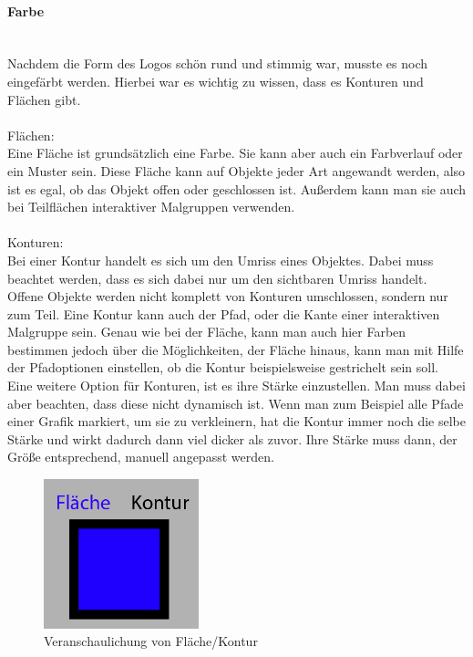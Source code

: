 \paragraph{Farbe}
\leavevmode \\
Nachdem die Form des Logos schön rund und stimmig war, musste es noch eingefärbt werden. Hierbei war es wichtig zu wissen, dass es Konturen und Flächen gibt.\cite{illustratorfarbe}
\leavevmode \\
\leavevmode \\
Flächen:
\leavevmode \\
Eine Fläche ist grundsätzlich eine Farbe. Sie kann aber auch ein Farbverlauf oder ein Muster sein. Diese Fläche kann auf Objekte jeder Art angewandt werden, also ist es egal, ob das Objekt offen oder geschlossen ist. Außerdem kann man sie auch bei Teilflächen interaktiver Malgruppen verwenden.\cite{illustratorfarbe}
\leavevmode \\
\leavevmode \\
Konturen:
\leavevmode \\
Bei einer Kontur handelt es sich um den Umriss eines Objektes. Dabei muss beachtet werden, dass es sich dabei nur um den sichtbaren Umriss handelt. Offene Objekte werden nicht komplett von Konturen umschlossen, sondern nur zum Teil. Eine Kontur kann auch der Pfad, oder die Kante einer interaktiven Malgruppe sein. Genau wie bei der Fläche, kann man auch hier Farben bestimmen jedoch über die Möglichkeiten, der Fläche hinaus, kann man mit Hilfe der Pfadoptionen einstellen, ob die Kontur beispielsweise gestrichelt sein soll. Eine weitere Option für Konturen, ist es ihre Stärke einzustellen. Man muss dabei aber beachten, dass diese nicht dynamisch ist. Wenn man zum Beispiel alle Pfade einer Grafik markiert, um sie zu verkleinern, hat die Kontur immer noch die selbe Stärke und wirkt dadurch dann viel dicker als zuvor. Ihre Stärke muss dann, der Größe entsprechend, manuell angepasst werden.\cite{illustratorfarbe}

\begin{figure}[H] 
  \centering
     \includegraphics[width=0.4\textwidth]{design_abb4.png}
  \caption{Veranschaulichung von Fläche/Kontur}
\end{figure}

